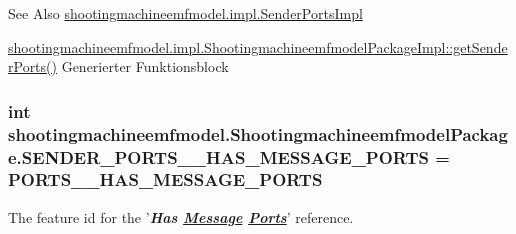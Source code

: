 \begin{DoxySeeAlso}{See Also}
\hyperlink{classshootingmachineemfmodel_1_1impl_1_1_sender_ports_impl}{shootingmachineemfmodel.\-impl.\-Sender\-Ports\-Impl} 

\hyperlink{classshootingmachineemfmodel_1_1impl_1_1_shootingmachineemfmodel_package_impl_a65cf0393c49f9556064a7d50a35b56a1}{shootingmachineemfmodel.\-impl.\-Shootingmachineemfmodel\-Package\-Impl\-::get\-Sender\-Ports()} Generierter Funktionsblock 
\end{DoxySeeAlso}
\hypertarget{interfaceshootingmachineemfmodel_1_1_shootingmachineemfmodel_package_a32f9aba86ce59940c62b442308c4bf7d}{
\subsubsection[{S\-E\-N\-D\-E\-R\-\_\-\-P\-O\-R\-T\-S\-\_\-\-\_\-\-H\-A\-S\-\_\-\-M\-E\-S\-S\-A\-G\-E\-\_\-\-P\-O\-R\-T\-S}]{\setlength{\rightskip}{0pt plus 5cm}int shootingmachineemfmodel.\-Shootingmachineemfmodel\-Package.\-S\-E\-N\-D\-E\-R\-\_\-\-P\-O\-R\-T\-S\-\_\-\-\_\-\-H\-A\-S\-\_\-\-M\-E\-S\-S\-A\-G\-E\-\_\-\-P\-O\-R\-T\-S = {\bf P\-O\-R\-T\-S\-\_\-\-\_\-\-H\-A\-S\-\_\-\-M\-E\-S\-S\-A\-G\-E\-\_\-\-P\-O\-R\-T\-S}}}\label{interfaceshootingmachineemfmodel_1_1_shootingmachineemfmodel_package_a32f9aba86ce59940c62b442308c4bf7d}
The feature id for the '{\itshape {\bfseries Has \hyperlink{interfaceshootingmachineemfmodel_1_1_message}{Message} \hyperlink{interfaceshootingmachineemfmodel_1_1_ports}{Ports}}}' reference.


